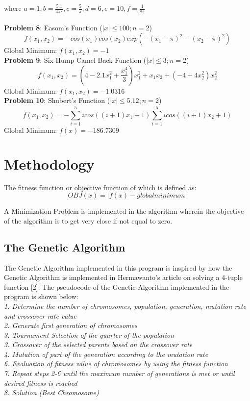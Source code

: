\documentclass{article}
\begin{document}
where $a=1, b=\frac{5.1}{4\pi^2}, c=\frac{5}{\pi}, d=6, e=10, f=\frac{1}{8\pi}$\\\\
\textbf{Problem 8}: Easom's Function ($|x| \leq 100; n=2$)
\begin{equation}
f(x_1,x_2) = -cos(x_1)cos(x_2)exp(-(x_1 - \pi)^2 - (x_2 - \pi)^2)
\end{equation}
Global Minimum: $f(x_1,x_2) = -1$\\
\textbf{Problem 9}: Six-Hump Camel Back Function ($|x| \leq 3; n=2$)
\begin{equation}
f(x_1,x_2) = (4 - 2.1x^2_1 + \frac{x^4_1}{3})x^2_1 + x_1 x_2 + (-4 + 4x^2_2)x^2_2
\end{equation}
Global Minimum: $f(x_1,x_2) = -1.0316$\\
\textbf{Problem 10}: Shubert's Function ($|x| \leq 5.12; n=2$)
\begin{equation}
f(x_1,x_2) = -\sum^5_{i=1}icos((i + 1)x_1 + 1)\sum^5_{i=1}icos((i + 1)x_2 + 1)
\end{equation}
Global Minimum: $f(x) = -186.7309$\\

\section{Methodology}
The fitness function or objective function of which is defined as:
\begin{equation}
OBJ(x) = |f(x) - global minimum|
\end{equation}

A Minimization Problem is implemented in the algorithm wherein the objective of the algorithm is to get very close if not equal to zero.

\subsection{The Genetic Algorithm}
The Genetic Algorithm implemented in this program is inspired by how the Genetic Algorithm is implemented in Hermawanto's article on solving a 4-tuple function [2]. The pseudocode of the Genetic Algorithm implemented in the program is shown below:\\
\textit{
1. Determine the number of chromosomes, population, generation, mutation rate and crossover rate value\\
2. Generate first generation of chromosomes\\
3. Tournament Selection of the quarter of the population\\
3. Crossover of the selected parents based on the crossover rate\\
4. Mutation of part of the generation according to the mutation rate\\
6. Evaluation of fitness value of chromosomes by using the fitness function\\
7. Repeat steps 2-6 until the maximum number of generations is met or until desired fitness is reached\\
8. Solution (Best Chromosome)\\
}
\end{document}
